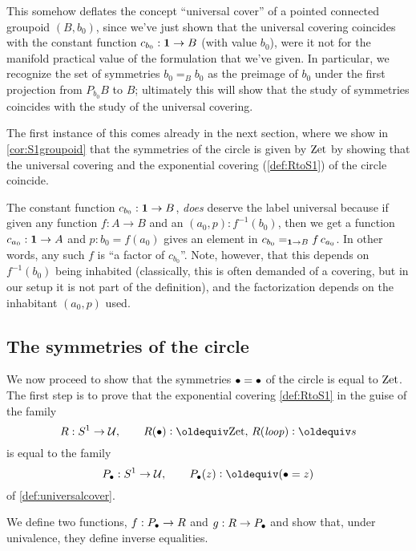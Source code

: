 \begin{remark}
  This somehow deflates the concept ``universal cover'' of a pointed connected groupoid $(B,b_0)$, since we've just shown that the universal covering coincides with the constant function $c_{b_0}:\mathbf{1}\to B$ (with value $b_0$), were it not for the manifold practical value of the formulation that we've given.  
In particular, we recognize the set of symmetries $b_0=_Bb_0$ as the preimage of $b_0$ under the first projection from $P_{b_0}B$ to $B$; ultimately this will show that the study of symmetries coincides with the study of the universal covering.

The first instance of this comes already in the next section, where we show in \cref{cor:S1groupoid} that the symmetries of the circle is given by $\mathrm{Zet}$ by showing that the universal covering and the exponential covering (\cref{def:RtoS1}) of the circle coincide.
\end{remark}
\begin{remark}
  The constant function $c_{b_0}:\mathbf{1}\to B$, \emph{does} deserve the label universal because if given any function $f:A\to B$ and an $(a_0,p): f^{-1}(b_0)$, then we get a function $c_{a_0}:\mathbf{1}\to A$ and $p:b_0=f(a_0)$ gives an element in $c_{b_0}=_{\mathbf{1}\to B}f\, c_{a_0}$.  In other words, any such $f$ is ``a factor of $c_{b_0}$''.  
Note, however, that this depends on $f^{-1}(b_0)$ being inhabited (classically, this is often demanded of a covering, but in our setup it is not part of the definition), and the factorization depends on the inhabitant $(a_0,p)$ used. 
\end{remark}




\subsection{The symmetries of the circle}
\label{sec:symcirc}
We now proceed to show that the symmetries $\bullet=\bullet$ of the circle is equal to $\mathrm{Zet}$.  The first step is to prove that the exponential covering \cref{def:RtoS1} in the guise of the family 
$$R: S^1\to\UU,\qquad R(\base)\defequi\zet,\, R(\Sloop)\defequi s$$
is equal to the family
$$P_\base:S^1\to\UU,\qquad P_\base(z)\defequi (\base=z)$$
of \cref{def:universalcover}.

We define two functions, $f:P_\bullet\to R$ and $g:R\to P_\bullet$ and show that, under univalence, they define inverse equalities.  

